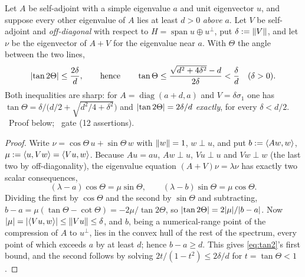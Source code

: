 \begin{theorem}\label{thm:tan2}
Let $A$ be self-adjoint with a simple eigenvalue $a$ and unit eigenvector $u$, and suppose every
other eigenvalue of $A$ lies at least $d>0$ \emph{above} $a$. Let $V$ be self-adjoint and
\emph{off-diagonal} with respect to $H=\operatorname{span}u\oplus u^\perp$, put
$\delta:=\lVert V\rVert$, and let $\nu$ be the eigenvector of $A+V$ for the eigenvalue near $a$. With
$\Theta$ the angle between the two lines,
\begin{equation}\label{eq:tan2}
   \lvert\tan 2\Theta\rvert\le\frac{2\delta}{d},
   \qquad\text{hence}\qquad
   \tan\Theta\le\frac{\sqrt{d^{2}+4\delta^{2}}-d}{2\delta}<\frac{\delta}{d}\quad(\delta>0).
\end{equation}
Both inequalities are sharp: for $A=\operatorname{diag}(a+d,a)$ and $V=\delta\sigma_1$ one has
$\tan\Theta=\delta\big/\bigl(d/2+\sqrt{d^{2}/4+\delta^{2}}\bigr)$ and
$\lvert\tan 2\Theta\rvert=2\delta/d$ \emph{exactly}, for every $\delta<d/2$.
\T\ Proof below; \V\ gate  (12 assertions).
\end{theorem}

\begin{proof}
Write $\nu=\cos\Theta\,u+\sin\Theta\,w$ with $\lVert w\rVert=1$, $w\perp u$, and put
$b:=\langle Aw,w\rangle$, $\mu:=\langle u,Vw\rangle=\langle Vu,w\rangle$. Because $Au=au$, $Aw\perp u$, $Vu\perp u$ and
$Vw\perp w$ (the last two by off-diagonality), the eigenvalue equation $(A+V)\nu=\lambda\nu$ has
exactly two scalar consequences,
\[
   (\lambda-a)\cos\Theta=\mu\sin\Theta,\qquad
   (\lambda-b)\sin\Theta=\mu\cos\Theta .
\]
Dividing the first by $\cos\Theta$ and the second by $\sin\Theta$ and subtracting,
$b-a=\mu(\tan\Theta-\cot\Theta)=-2\mu/\tan 2\Theta$, so
$\lvert\tan 2\Theta\rvert=2\lvert\mu\rvert/\lvert b-a\rvert$. Now $\lvert\mu\rvert=\lvert\langle Vu,w\rangle\rvert\le\lVert Vu\rVert\le\delta$,
and $b$, being a numerical-range point of the compression of $A$ to $u^\perp$, lies in the convex
hull of the rest of the spectrum, every point of which exceeds $a$ by at least $d$; hence
$b-a\ge d$. This gives \eqref{eq:tan2}'s first bound, and the second follows by solving
$2t/(1-t^{2})\le2\delta/d$ for $t=\tan\Theta<1$.
\end{proof}

